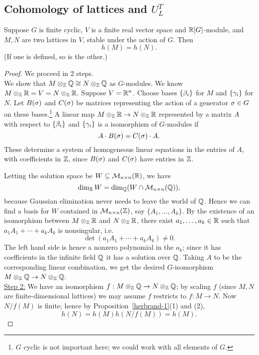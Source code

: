 \subsection{Cohomology of lattices and $U_L^T$}
\begin{pr}
Suppose $G$ is finite cyclic, $V$ is a finite real vector space and $\mathbb{R}[G]$-module, and $M,N$ are two lattices in $V$, stable under the action of $G$. Then
\[
h(M)=h(N).
\]
(If one is defined, so is the other.)
\end{pr}
\begin{proof}
We proceed in 2 steps.\\

 We show that $M\otimes_{\mathbb{Z}}\mathbb{Q}\cong N\otimes_{\mathbb{Z}} \mathbb{Q}$ as $G$-modules. We know $M\otimes_{\mathbb{Z}}\mathbb{R}=V=N\otimes_{\mathbb{Z}} \mathbb{R}$. Suppose $V=\mathbb{R}^n$. Choose bases $\{\beta_i\}$ for $M$ and $\{\gamma_i\}$ for $N$. Let $B(\sigma)$ and $C(\sigma)$ be matrices representing the action of a generator $\sigma\in G$ on these bases.\footnote{$G$ cyclic is not important here; we could work with all elements of $G$.} A linear map $M\otimes_{\mathbb{Z}}\mathbb{R}\to N\otimes_{\mathbb{Z}} \mathbb{R}$ represented by a matrix $A$ with respect to $\{\beta_i\}$ and $\{\gamma_i\}$ is a isomorphism of $G$-modules if
\[
A\cdot B(\sigma)=C(\sigma)\cdot A.
\]
These determine a system of homogeneous linear equations in the entries of $A$, with coefficients in $\mathbb{Z}$, since $B(\sigma)$ and $C(\sigma)$ have entries in $\mathbb{Z}$. 

Letting the solution space be $W\subseteq \mathcal{M}_{n\times n}(\mathbb{R})$, we have 
\[
\dim_{\mathbb{R}} W=\dim_{\mathbb{Q}}(W\cap \mathcal{M}_{n\times n}(\mathbb{Q})),
\]
because Gaussian elimination never needs to leave the world of $\mathbb{Q}$. Hence we can find a basis for $W$ contained in $\mathcal{M}_{n\times n}(\mathbb{Z})$, say $\{A_1,\ldots, A_k\}$. By the existence of an isomorphism between $M\otimes_{\mathbb{Z}}\mathbb{R}$ and $N\otimes_{\mathbb{Z}} \mathbb{R}$, there exist $a_1,\ldots, a_k\in \mathbb{R}$ such that $a_1A_1+\cdots +a_kA_k$ is nonsingular, i.e.
\[
\det(a_1A_1+\cdots +a_kA_k)\ne 0.
\]
The left hand side is hence a nonzero polynomial in the $a_k$; since it has coefficients in the infinite field $\mathbb{Q}$ it has a solution over $\mathbb{Q}$. 
Taking $A$ to be the corresponding linear combination, we get the desired $G$-isomorphism $M\otimes_{\mathbb{Z}}\mathbb{Q}\to N\otimes_{\mathbb{Z}} \mathbb{Q}$.\\

\noindent\underline{Step 2:} We have an isomorphism $f:M\otimes_{\mathbb{Z}}\mathbb{Q}\to N\otimes_{\mathbb{Z}} \mathbb{Q}$; by scaling $f$ (since $M,N$ are finite-dimensional lattices) we may assume $f$ restricts to $f:M\to N$. Now $N/f(M)$ is finite; hence by Proposition~\ref{herbrand-1}(1) and (2),
\[
h(N)=h(M)h(N/f(M))=h(M).
\]
\end{proof}

